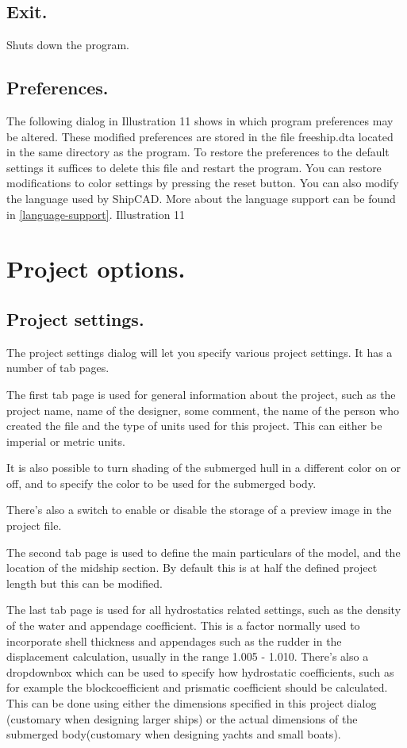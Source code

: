 \documentclass[12pt]{article}
\begin{document}
\subsection{Exit.}
Shuts down the program.

\subsection{Preferences.}
The following dialog in Illustration 11 shows in which program
preferences may be altered. These modified preferences are stored in
the file freeship.dta located in the same directory as the program. To
restore the preferences to the default settings it suffices to delete
this file and restart the program. You can restore modifications to
color settings by pressing the reset button.  You can also modify the
language used by ShipCAD. More about the language support can be found
in \ref{language-support}.
Illustration 11

\section{Project options.}

\subsection{Project settings.} \label{project-settings}
The project settings dialog will let you specify various project
settings. It has a number of tab pages.

The first tab page is used for general information about the
project, such as the project name, name of the designer, some
comment, the name of the person who created the file and the
type of units used for this project. This can either be imperial or
metric units.

It is also possible to turn shading of the submerged hull in a
different color on or off, and to specify the color to be used for the
submerged body.

There's also a switch to enable or disable the storage of a
preview image in the project file.

The second tab page is used to define the main particulars of the
model, and the location of the midship section. By default this is
at half the defined project length but this can be modified.

The last tab page is used for all hydrostatics related settings, such
as the density of the water and appendage coefficient. This is a
factor normally used to incorporate shell thickness and appendages
such as the rudder in the displacement calculation, usually in the
range 1.005 - 1.010. There's also a dropdownbox which can be used to
specify how hydrostatic coefficients, such as for example the
blockcoefficient and prismatic coefficient should be calculated. This
can be done using either the dimensions specified in this project
dialog (customary when designing larger ships) or the actual
dimensions of the submerged body(customary when designing yachts and
small boats).
\end{document}
